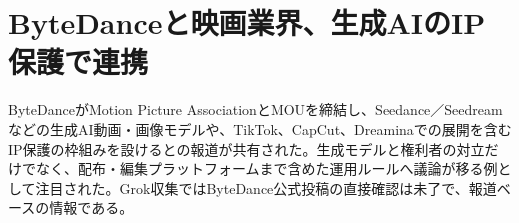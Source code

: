 \section{ByteDanceと映画業界、生成AIのIP保護で連携}
ByteDanceがMotion Picture AssociationとMOUを締結し、Seedance／Seedreamなどの生成AI動画・画像モデルや、TikTok、CapCut、Dreaminaでの展開を含むIP保護の枠組みを設けるとの報道が共有された。生成モデルと権利者の対立だけでなく、配布・編集プラットフォームまで含めた運用ルールへ議論が移る例として注目された。Grok収集ではByteDance公式投稿の直接確認は未了で、報道ベースの情報である。
